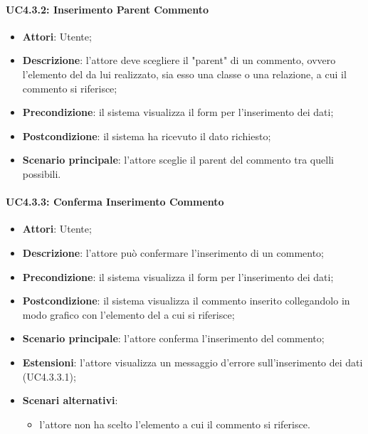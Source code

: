 \paragraph{UC4.3.2: Inserimento Parent Commento}
\label{UC4.3.2}
\begin{itemize}
	\item \textbf{Attori}: Utente;
	\item \textbf{Descrizione}: l'attore deve scegliere il "parent" di un commento, ovvero l'elemento del  da lui realizzato, sia esso una classe o una relazione, a cui il commento si riferisce;
	\item \textbf{Precondizione}: il sistema visualizza il form per l'inserimento dei dati;
	\item \textbf{Postcondizione}: il sistema ha ricevuto il dato richiesto;
	\item \textbf{Scenario principale}: l'attore sceglie il parent del commento tra quelli possibili.
\end{itemize}

\paragraph{UC4.3.3: Conferma Inserimento Commento}
\label{UC4.3.3}
\begin{itemize}
	\item \textbf{Attori}: Utente;
	\item \textbf{Descrizione}: l'attore può confermare l'inserimento di un commento;
	\item \textbf{Precondizione}: il sistema visualizza il form per l'inserimento dei dati;
	\item \textbf{Postcondizione}: il sistema visualizza il commento inserito collegandolo in modo grafico con l'elemento del  a cui si riferisce;
	\item \textbf{Scenario principale}: l'attore conferma l'inserimento del commento;
	\item \textbf{Estensioni}: l'attore visualizza un messaggio d'errore sull'inserimento dei dati (UC4.3.3.1);
	\item \textbf{Scenari alternativi}:
	\begin{itemize}
		\item l'attore non ha scelto l'elemento a cui il commento si riferisce.
	\end{itemize}
\end{itemize}

